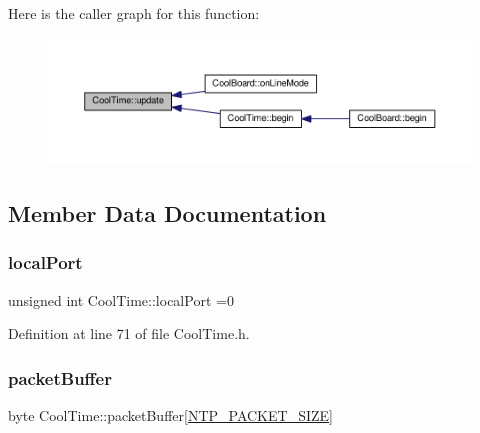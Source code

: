 Here is the caller graph for this function\+:\nopagebreak
\begin{figure}[H]
\begin{center}
\leavevmode
\includegraphics[width=350pt]{d6/d49/class_cool_time_aae601f795452cfa48d9fb337aed483a8_icgraph}
\end{center}
\end{figure}


\subsection{Member Data Documentation}
\mbox{\label{class_cool_time_a2f777da44d7ba678be8185299e9b49d1}} 
\subsubsection{\texorpdfstring{local\+Port}{localPort}}
{\footnotesize\ttfamily unsigned int Cool\+Time\+::local\+Port =0\hspace{0.3cm}{\ttfamily [private]}}



Definition at line 71 of file Cool\+Time.\+h.

\mbox{\label{class_cool_time_a27e6abc82a5c2f72161956967005bec7}} 
\subsubsection{\texorpdfstring{packet\+Buffer}{packetBuffer}}
{\footnotesize\ttfamily byte Cool\+Time\+::packet\+Buffer\mbox{[}\hyperlink{_cool_time_8h_a56a6ea64006651b4f42adf713e244f06}{N\+T\+P\+\_\+\+P\+A\+C\+K\+E\+T\+\_\+\+S\+I\+ZE}\mbox{]}\hspace{0.3cm}{\ttfamily [private]}}



